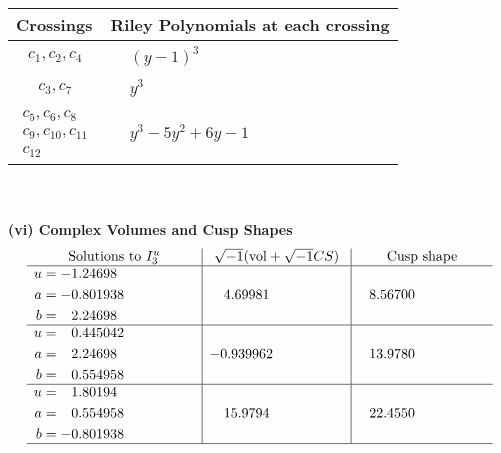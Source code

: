 \documentclass[1p]{elsarticle_modified}
\theoremstyle{definition}
\newcommand{\I}{\sqrt{-1}}
\begin{document}
\begin{tabular}{m{50pt}|m{274pt}}
Crossings & \hspace{64pt}Riley Polynomials at each crossing \\
\hline $$\begin{aligned}c_{1},c_{2},c_{4}\end{aligned}$$&$\begin{aligned}
&(y-1)^3
\end{aligned}$\\
\hline $$\begin{aligned}c_{3},c_{7}\end{aligned}$$&$\begin{aligned}
&y^3
\end{aligned}$\\
\hline $$\begin{aligned}c_{5},c_{6},c_{8}\\c_{9},c_{10},c_{11}\\c_{12}\end{aligned}$$&$\begin{aligned}
&y^3-5 y^2+6 y-1
\end{aligned}$\\
\hline
\end{tabular}\\~\\
\newpage\flushleft \textbf{(vi) Complex Volumes and Cusp Shapes}
$$\begin{array}{c|c|c}  
\text{Solutions to }I^u_{3}& \I (\text{vol} + \sqrt{-1}CS) & \text{Cusp shape}\\
 \hline 
\begin{aligned}
u &= -1.24698\phantom{ +0.000000I} \\
a &= -0.801938\phantom{ +0.000000I} \\
b &= \phantom{-}2.24698\phantom{ +0.000000I}\end{aligned}
 & \phantom{-}4.69981\phantom{ +0.000000I} & \phantom{-}8.56700\phantom{ +0.000000I} \\ \hline\begin{aligned}
u &= \phantom{-}0.445042\phantom{ +0.000000I} \\
a &= \phantom{-}2.24698\phantom{ +0.000000I} \\
b &= \phantom{-}0.554958\phantom{ +0.000000I}\end{aligned}
 & -0.939962\phantom{ +0.000000I} & \phantom{-}13.9780\phantom{ +0.000000I} \\ \hline\begin{aligned}
u &= \phantom{-}1.80194\phantom{ +0.000000I} \\
a &= \phantom{-}0.554958\phantom{ +0.000000I} \\
b &= -0.801938\phantom{ +0.000000I}\end{aligned}
 & \phantom{-}15.9794\phantom{ +0.000000I} & \phantom{-}22.4550\phantom{ +0.000000I}\\
 \hline 
 \end{array}$$\newpage\newpage\renewcommand{\arraystretch}{1}
\end{document}
